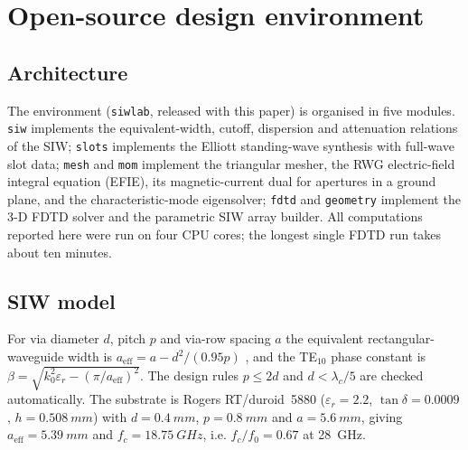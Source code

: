 \documentclass[preprint,12pt]{elsarticle}
\begin{document}
\section{Open-source design environment}\label{sec:env}
\subsection{Architecture}
The environment (\texttt{siwlab}, released with this paper) is organised in five modules. \texttt{siw} implements the equivalent-width, cutoff, dispersion and attenuation relations of the SIW; \texttt{slots} implements the Elliott standing-wave synthesis with full-wave slot data; \texttt{mesh} and \texttt{mom} implement the triangular mesher, the RWG electric-field integral equation (EFIE), its magnetic-current dual for apertures in a ground plane, and the characteristic-mode eigensolver; \texttt{fdtd} and \texttt{geometry} implement the 3-D FDTD solver and the parametric SIW array builder. All computations reported here were run on four CPU cores; the longest single FDTD run takes about ten minutes.

\subsection{SIW model}
For via diameter $d$, pitch $p$ and via-row spacing $a$ the equivalent rectangular-waveguide width is $a_{\mathrm{eff}} = a - d^2/(0.95p)$ \cite{cassivi2002}, and the TE$_{10}$ phase constant is $\beta = \sqrt{k_0^2\varepsilon_r - (\pi/a_{\mathrm{eff}})^2}$. The design rules $p \le 2d$ and $d < \lambda_c/5$ \cite{deslandes2006,xu2005} are checked automatically. The substrate is Rogers RT/duroid~5880 ($\varepsilon_r = 2.2$, $\tan\delta = 0.0009$, $h = \SI{0.508}{mm}$) with $d = \SI{0.4}{mm}$, $p = \SI{0.8}{mm}$ and $a = \SI{5.6}{mm}$, giving $a_{\mathrm{eff}} = \SI{5.39}{mm}$ and $f_c = \SI{18.75}{GHz}$, i.e. $f_c/f_0 = 0.67$ at 28~GHz.
\end{document}
